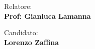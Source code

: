 \begin{titlepage}
\begin{center}
\end{center}
\vspace{30mm}

\begin{minipage}[t]{0.47\textwidth}
	{\large{Relatore:}{\normalsize\vspace{3mm}
	\bf\\ \large{Prof: Gianluca Lamanna}}}
\end{minipage}
\hfill
\begin{minipage}[t]{0.47\textwidth}\raggedleft
	{\large{Candidato:}{\normalsize\vspace{3mm} \bf\\ \large{Lorenzo Zaffina}}}
\end{minipage}

\vspace{30mm}
\hrulefill
\\

\end{titlepage}